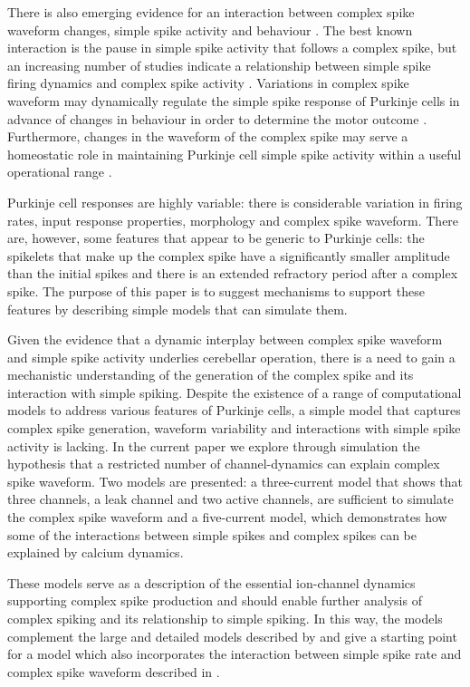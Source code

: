\documentclass[utf8]{frontiersSCNS} %
\begin{document}
There is also emerging evidence for an interaction between complex
spike waveform changes, simple spike activity and behaviour
\cite{YangLispberger2014,StrengEtAl2017}. The best known interaction
is the pause in simple spike activity that follows a complex spike, but
an increasing number of studies indicate a relationship between simple
spike firing dynamics and complex spike activity
\cite{Mano1970,Gilbert1976,CampbellHesslow1986,HashimotoKano1998,ServaisEtAl2004,MarutaEtAl2007,WarnaarEtAl2015,BurroughsEtAl2016}.
Variations in complex spike waveform may dynamically regulate the
simple spike response of Purkinje cells in advance of changes in
behaviour in order to determine the motor outcome
\cite{StrengEtAl2017}. Furthermore, changes in the waveform of the
complex spike may serve a homeostatic role in maintaining Purkinje
cell simple spike activity within a useful operational range
\cite{BurroughsEtAl2016}.

Purkinje cell responses are highly variable: there is considerable variation in firing rates, input response properties, morphology and complex spike waveform. There are, however, some features that appear to be generic to Purkinje cells: the spikelets that make up the complex spike have a significantly smaller amplitude than the initial spikes and there is an extended refractory period after a complex spike. The purpose of this paper is to suggest mechanisms to support these features by describing simple models that can simulate them.

Given the evidence that a dynamic interplay between complex spike
waveform and simple spike activity underlies cerebellar operation,
there is a need to gain a mechanistic understanding of the generation
of the complex spike and its interaction with simple spiking. Despite
the existence of a range of computational models to address various
features of Purkinje cells, a simple model that captures complex spike
generation, waveform variability and interactions with simple spike
activity is lacking. In the current paper we explore through
simulation the hypothesis that a restricted number of channel-dynamics
can explain complex spike waveform. Two models are presented: a
three-current model that shows that three channels, a leak channel and
two active channels, are sufficient to simulate the complex spike
waveform and a five-current model, which demonstrates how some of the
interactions between simple spikes and complex spikes can be explained
by calcium dynamics.

These models serve as a description of the essential ion-channel
dynamics supporting complex spike production and should enable further
analysis of complex spiking and its relationship to simple spiking. In
this way, the models complement the large and detailed models
described by \cite{VeysEtAl2013,ZangEtAl2018} and give a starting
point for a model which also incorporates the interaction between
simple spike rate and complex spike waveform described in
\cite{BurroughsEtAl2016}.
\end{document}
